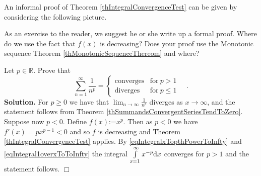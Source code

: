 \documentclass[12pt]{book}
\newcommand{\eqdef}{\textbf{:=}}
\newenvironment{solution}{\medskip\noindent\textbf{Solution.} }{$\Box$}
\renewcommand{\optionalDisplay}[1]{}
\newcommand{\doublebrace}[4]{\left\{\begin{array}{ll} #1 & #2 \\#3 & #4  \end{array} \right.}
\begin{document}
An informal proof of Theorem \ref{thIntegralConvergenceTest} can be given by considering the following picture.
\optionalDisplay{
\psset{xunit=0.6cm,yunit=0.6cm}

\begin{pspicture}(-1,-1)(9.5,6)

\rput(5.5,4){$\underbrace{ \int\limits_{1}^\infty f(x) \diff x}_{\mathrm{region~under~curve}} \geq\underbrace{ \sum\limits_{n=2}^{\infty} f(n)}_{\mathrm{blue~region}}$}

\psaxes[labels=x, ticks=x]{<->}(0,0)(-1,-1)(9,6)

\pscustom[fillstyle=solid, linestyle=none,fillcolor=gray!30]{
\psplot{1}{9}{ 5 x  div}
\psline[linestyle=none](9, 0)(1,0)
}
\psplot[linewidth=1pt]{1}{9}{ 5 x  div}

\multido{\ra=1.0+1.0}{8}{%
\psframe[fillstyle=solid, fillcolor=cyan!40](\ra,0)(! \ra\space 1 add \space 5 \ra\space 1 add div )
}
\end{pspicture}
\begin{pspicture}(-1,-1)(9,6)
\psaxes[labels=x, ticks=x]{<->}(0,0)(-1,-1)(9,6)
\rput(5.5,4){$\underbrace{ \int\limits_{1}^\infty f(x) \diff x}_{\mathrm{region~under~curve}}\leq\underbrace{ \sum\limits_{n=1}^{\infty} f(n)}_{\mathrm{blue~region}}$}

\multido{\ra=1.0+1.0}{8}{%
\psframe[fillstyle=solid, fillcolor=cyan!40](\ra,0)(! \ra\space 1 add \space 5 \ra\space div )
}
\psplot[linewidth=1pt]{1}{9}{ 5 x  div}
\end{pspicture}
} %

As an exercise to the reader, we suggest he or she write up a formal proof. Where do we use the fact that $f(x)$ is decreasing? Does your proof use the Monotonic sequence Theorem \ref{thMonotonicSequenceThereom} and where?

Let $p\in \mathbb R$. Prove that
\begin{equation}\label{eqSumnToThePthConverges}
\sum\limits_{n=1}^{\infty} \frac{1}{n^p}= \doublebrace{\mathrm{converges}}{\mathrm{for~}p>1}{\mathrm{diverges}}{\mathrm{for~}p\leq 1}\quad .
\end{equation}
\begin{solution}
For $p\geq 0$ we have that $\lim_{n\to \infty} \frac{1}{n^p}$ diverges as $x\to \infty$, and the statement follows from Theorem \ref{thSummandsConvergentSeriesTendToZero}. Suppose now $p< 0$. Define $f(x)\eqdef x^{p}$. Then as $p<0$ we have $f'(x)= px^{p-1}<0$ and so $f$ is decreasing and Theorem \ref{thIntegralConvergenceTest} applies. By \eqref{eqIntegralxTopthPowerToInfty} and \eqref{eqIntegral1overxToToInfty}  the integral $\int\limits_{x=1}^{\infty} x^{-p}{\normalfont \text{d}} x$ converges for $p>1$ and the statement follows.
\end{solution}
\end{document}

